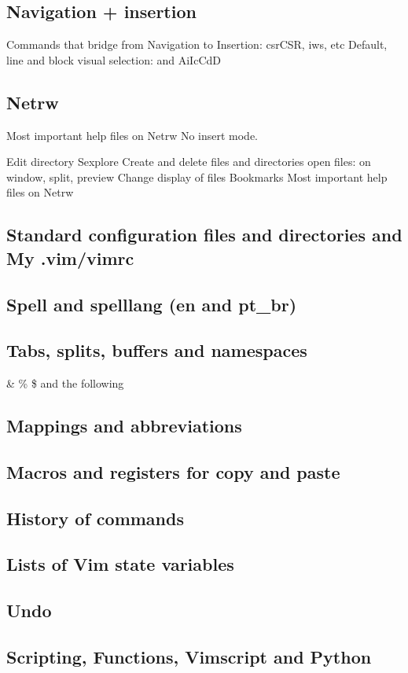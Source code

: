 \documentclass{article}
\begin{document}
\subsection{Navigation + insertion}\label{navIn}
Commands that bridge from Navigation to Insertion:
csrCSR, iws, etc
Default, line and block visual selection:
  and AiIcCdD

\subsection{Netrw}
Most important help files on Netrw
No insert mode.

Edit directory
Sexplore
Create and delete files and directories
open files: on window, split, preview
Change display of files
Bookmarks
Most important help files on Netrw


\subsection{Standard configuration files and directories and My .vim/vimrc}
\subsection{Spell and spelllang (en and pt\_br)}
\subsection{Tabs, splits, buffers and namespaces}
\& \% \$ and the following
\subsection{Mappings and abbreviations}
\subsection{Macros and registers for copy and paste}
\subsection{History of commands}
\subsection{Lists of Vim state variables}
\subsection{Undo}
\subsection{Scripting, Functions, Vimscript and Python}
\end{document}
